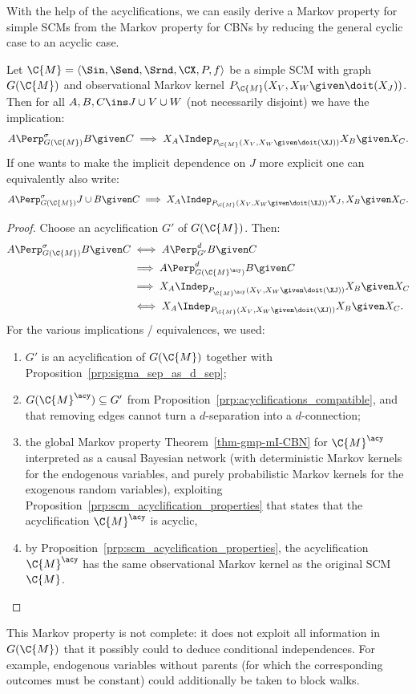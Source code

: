 With the help of the acyclifications,
we can easily derive a Markov property for simple SCMs from the Markov property for CBNs by reducing
the general cyclic case to an acyclic case.
\begin{Cor}\label{cor:gmp_simple_scm}
  Let $\C{M} = \langle \Sin, \Send, \Srnd, \CX, P, f \rangle$ be a simple SCM with graph $G(\C{M})$
  and observational Markov kernel $P_{\C{M}}(X_V,X_W \given \doit(X_J))$.
  Then for all $A, B, C \ins J \cup V \cup W$ (not necessarily disjoint) we have the implication:
  $$A \Perp^\sigma_{G(\C{M})} B \given C \implies X_A \Indep_{P_{\C{M}}(X_V,X_W \given \doit(\XJ))} X_B \given X_C.$$
  If one wants to make the implicit dependence on $J$ more explicit one can equivalently also write:
  $$A \Perp^\sigma_{G(\C{M})} J \cup B \given C \implies X_A \Indep_{P_{\C{M}}(X_V,X_W \given \doit(\XJ))} X_J,X_B \given X_C.$$
\end{Cor}
\begin{proof}
  Choose an acyclification $G'$ of $G(\C{M})$. Then:
  \begin{equation*}\begin{split}
    A \Perp^\sigma_{G(\C{M})} B \given C 
    & \iff A \Perp^d_{G'} B \given C \\
    & \implies A \Perp^d_{G(\C{M}^\acy)} B \given C \\
    & \implies X_A \Indep_{P_{\C{M}^\acy}(X_V,X_W \given \doit(\XJ))} X_B \given X_C \\
    & \iff X_A \Indep_{P_{\C{M}}(X_V,X_W \given \doit(\XJ))} X_B \given X_C.
  \end{split}\end{equation*}
  For the various implications / equivalences, we used:
  \begin{enumerate}
    \item $G'$ is an acyclification of $G(\C{M})$ together with Proposition~\ref{prp:sigma_sep_as_d_sep}; 
    \item $G(\C{M}^\acy) \subseteq G'$ from Proposition~\ref{prp:acyclifications_compatible}, and that removing edges cannot turn a $d$-separation into a $d$-connection; 
    \item the global Markov property Theorem~\ref{thm-gmp-mI-CBN} for $\C{M}^\acy$ interpreted as a causal Bayesian network (with deterministic Markov kernels for the endogenous variables, and purely probabilistic Markov kernels for the exogenous random variables), exploiting Proposition~\ref{prp:scm_acyclification_properties} that states that the acyclification $\C{M}^\acy$ is acyclic,
    \item by Proposition~\ref{prp:scm_acyclification_properties}, the acyclification $\C{M}^\acy$ has the same observational Markov kernel as the original SCM $\C{M}$.
  \end{enumerate}
\end{proof}
This Markov property is not complete: it does not exploit all information in $G(\C{M})$ that it possibly could to deduce 
conditional independences. For example, endogenous variables without parents (for which the corresponding outcomes must be
constant) could additionally be taken to block walks.

